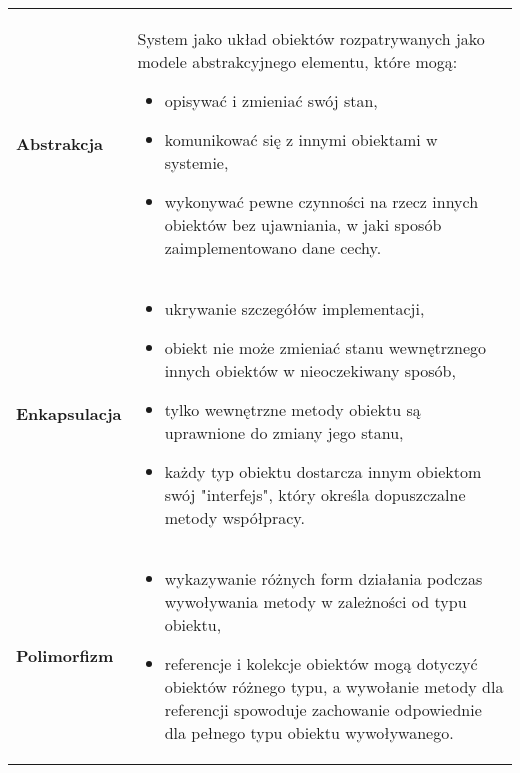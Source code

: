 \documentclass[../main.tex]{subfiles}
\begin{document}
    \begin{table}[H]
        \begin{center}
            \begin{tabular}{  p{3cm} p{12cm}  }
                \textbf{Abstrakcja} &
                System jako układ obiektów rozpatrywanych jako modele
                abstrakcyjnego elementu, które mogą:
                \begin{itemize}
                    \item opisywać i zmieniać swój stan,
                    \item komunikować się z innymi obiektami w systemie,
                    \item wykonywać pewne czynności na rzecz innych obiektów bez ujawniania, w jaki sposób zaimplementowano
                    dane cechy.
                \end{itemize}\\


                \textbf{Enkapsulacja}
                &
                \begin{itemize}
                    \item ukrywanie szczegółów implementacji,
                    \item obiekt nie może zmieniać stanu wewnętrznego innych obiektów w nieoczekiwany sposób,
                    \item tylko wewnętrzne metody obiektu są uprawnione do zmiany jego stanu,
                    \item każdy typ obiektu dostarcza innym obiektom swój "interfejs", który określa dopuszczalne metody współpracy.
                \end{itemize}\\


                \textbf{Polimorfizm}
                &
                \begin{itemize}
                    \item wykazywanie różnych form działania podczas wywoływania metody w zależności od typu obiektu,
                    \item referencje i kolekcje obiektów mogą dotyczyć obiektów różnego typu, a wywołanie metody dla
                    referencji spowoduje zachowanie odpowiednie dla pełnego typu obiektu wywoływanego.
                \end{itemize}\\



\end{tabular}
\end{center}
\end{table}
\end{document}

